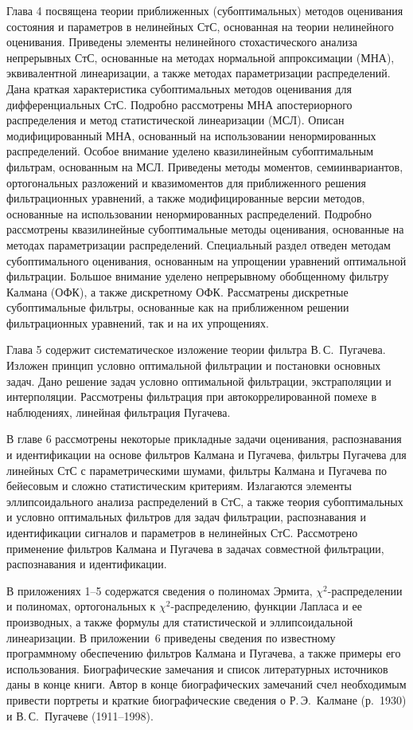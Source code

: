      Глава 4 посвящена теории приближенных (субоптимальных) методов 
оценивания состояния и параметров в нелинейных СтС, основанная на теории 
нелинейного оценивания. Приведены элементы нелинейного стохастического 
анализа непрерывных СтС, основанные на методах нормальной аппроксимации 
(МНА), эквивалентной линеаризации, а также методах параметризации 
распределений. Дана краткая характеристика субоптимальных методов оценивания 
для дифференциальных СтС. Подробно рассмотрены МНА апостериорного 
распределения и метод статистической линеаризации (МСЛ). Описан 
модифицированный МНА, основанный на использовании ненормированных 
распределений. Особое внимание уделено квазилинейным субоптимальным 
фильтрам, основанным на МСЛ. Приведены методы моментов, семиинвариантов, 
ортогональных разложений и квазимоментов для приближенного решения 
фильтрационных уравнений, а также модифицированные версии методов, 
основанные на использовании ненормированных распределений. Подробно 
рассмотрены квазилинейные субоптимальные методы оценивания, основанные на 
методах параметризации распределений. Специальный раздел отведен методам 
субоптимального оценивания, основанным на упрощении уравнений оптимальной 
фильтрации.  Большое внимание уделено непрерывному обобщенному фильтру 
Калмана (ОФК), а также дискретному ОФК. Рассматрены дискретные 
субоптимальные фильтры, основанные как на приближенном решении 
фильтрационных уравнений, так и на их упрощениях.
     
     Глава 5 содержит систематическое изложение теории фильтра В.\,С.~Пугачева. 
Изложен принцип условно оптимальной фильтрации и постановки основных задач. 
Дано решение задач условно оптимальной фильтрации, экстраполяции и 
интерполяции. Рассмотрены фильтрация при автокоррелированной помехе в 
наблюдениях, линейная фильтрация Пугачева. 
     
     В главе 6 рассмотрены некоторые прикладные задачи оценивания, 
распознавания и идентификации на основе фильтров Калмана и Пугачева, фильтры 
Пугачева для линейных СтС с параметрическими шумами, фильтры Калмана и 
Пугачева по бейесовым и сложно статистическим критериям. Излагаются элементы 
эллипсоидального анализа распределений в СтС, а также теория субоптимальных и 
условно оптимальных фильтров для задач фильтрации, распознавания и 
идентификации сигналов и параметров в нелинейных СтС. Рассмотрено применение 
фильтров Калмана и Пугачева в задачах совместной фильтрации, распознавания и 
идентификации.
     
     В приложениях 1--5 содержатся сведения о полиномах Эрмита, 
     $\chi^2$-распределении и полиномах, ортогональных к 
     $\chi^2$-распределению, функции Лапласа и ее производных, а также формулы 
для статистической и эллипсоидальной линеаризации. В приложении~6 приведены 
сведения по известному программному обеспечению фильтров Калмана и Пугачева, а 
также примеры его использования. Биографические замечания и список 
литературных источников даны в конце книги. Автор в конце биографических 
замечаний счел необходимым привести портреты и краткие биографические сведения 
о Р.\,Э.~Калмане (р.~1930) и В.\,С.~Пугачеве (1911--1998).
     
